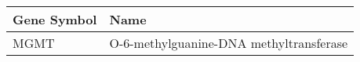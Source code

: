 \begin{tabular}{ll}
\toprule
Gene Symbol &                                    Name \\
\midrule
       MGMT & O-6-methylguanine-DNA methyltransferase \\
\bottomrule
\end{tabular}
